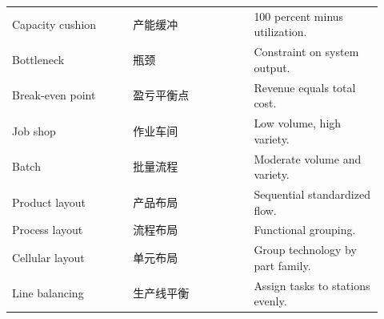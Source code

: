 \documentclass[11pt,a4paper]{ctexart}
\begin{document}
\begin{longtable}{L{0.3\linewidth}L{0.3\linewidth}L{0.32\linewidth}}
Capacity cushion & 产能缓冲 & 100 percent minus utilization. \\
Bottleneck & 瓶颈 & Constraint on system output. \\
Break-even point & 盈亏平衡点 & Revenue equals total cost. \\
Job shop & 作业车间 & Low volume, high variety. \\
Batch & 批量流程 & Moderate volume and variety. \\
Product layout & 产品布局 & Sequential standardized flow. \\
Process layout & 流程布局 & Functional grouping. \\
Cellular layout & 单元布局 & Group technology by part family. \\
Line balancing & 生产线平衡 & Assign tasks to stations evenly. \\
\bottomrule
\end{longtable}
\end{document}
